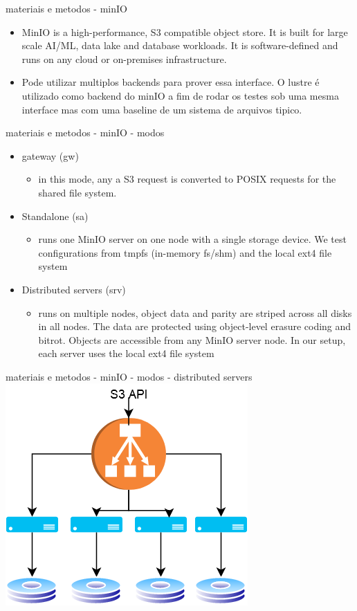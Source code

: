 \documentclass{beamer}
\begin{document}
\begin{frame}{materiais e metodos - minIO}
	\begin{itemize}
		\item 	MinIO is a high-performance, S3 compatible object store. It is built for
		large scale AI/ML, data lake and database workloads. It is software-defined
		and runs on any cloud or on-premises infrastructure.
		\item	Pode utilizar multiplos backends para prover essa interface. O lustre é utilizado como backend do minIO a fim de rodar os testes sob uma mesma interface mas com uma baseline de um sistema de arquivos tipico.
	\end{itemize}
\end{frame}
\begin{frame}{materiais e metodos - minIO - modos}
	\begin{itemize}
		\item gateway (gw)
		\begin{itemize}
			\item in this mode, any a S3 request is converted to POSIX requests for the shared file system.
		\end{itemize}
		\item Standalone (sa)
		\begin{itemize}
			\item runs one MinIO server on one node with a single storage device. We
			test configurations from tmpfs (in-memory fs/shm) and the local ext4 file system
		\end{itemize}
		\item Distributed servers (srv)
		\begin{itemize}
			\item runs on multiple nodes, object data and parity are striped
			across all disks in all nodes. The data are protected using object-level erasure coding
			and bitrot. Objects are accessible from any MinIO server node. In our setup, each
			server uses the local ext4 file system
		\end{itemize}
	\end{itemize}
\end{frame}
\begin{frame}{materiais e metodos - minIO - modos - distributed servers}
    \includegraphics[width=0.6\paperwidth]{presentation/5.png}
\end{frame}
\end{document}

